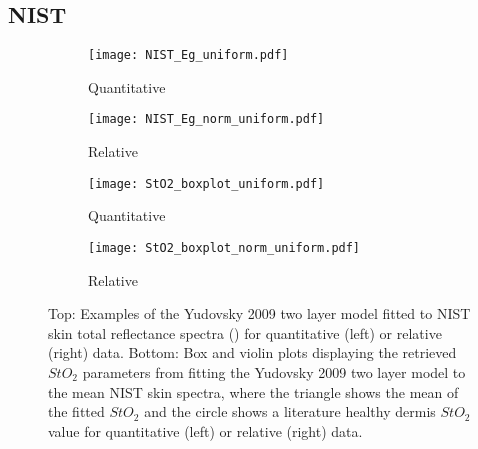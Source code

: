 \subsection{NIST}
\begin{figure}[h]
    \centering
    \begin{subfigure}{0.49\textwidth}
        \texttt{[image: NIST\_Eg\_uniform.pdf]}
        \caption{Quantitative}
        \label{fig:egspectraNISTu}
    \end{subfigure}
    \begin{subfigure}{0.49\textwidth}
        \texttt{[image: NIST\_Eg\_norm\_uniform.pdf]}
        \caption{Relative}
        \label{fig:egspectraNISTnormu}
    \end{subfigure}
    \begin{subfigure}{0.49\textwidth}
        \texttt{[image: StO2\_boxplot\_uniform.pdf]}
        \caption{Quantitative}
        \label{fig:egparamStO2NISTu}
    \end{subfigure}
    \begin{subfigure}{0.49\textwidth}
        \texttt{[image: StO2\_boxplot\_norm\_uniform.pdf]}
        \caption{Relative}
        \label{fig:egparamStO2NISTnormu}
    \end{subfigure}
    \caption{Top: Examples of the Yudovsky 2009 two layer model fitted to NIST skin total reflectance spectra () for quantitative (left) or relative (right) data. Bottom: Box and violin plots displaying the retrieved $StO_2$ parameters from fitting the Yudovsky 2009 two layer model to the mean NIST skin spectra, where the triangle shows the mean of the fitted $StO_2$ and the circle shows a literature healthy dermis $StO_2$ value \cite{VanManen2021} for quantitative (left) or relative (right) data.}
    \label{fig:NISTuniform}
\end{figure}
